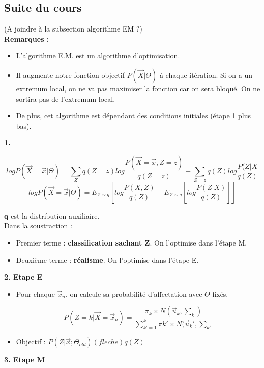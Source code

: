 \documentclass{article}
\begin{document}
\subsection{Suite du cours}

(A joindre à la subsection algorithme EM ?) \\
\textbf{Remarques :}
\begin{itemize}
\item L'algorithme E.M. est un algorithme d'optimisation.
\item Il augmente notre fonction objectif $P(\vec{X} | \Theta)$ à chaque itération. Si on a un extremum local, on ne va pas maximiser la fonction car on sera bloqué. On ne sortira pas de l'extremum local.
\item De plus, cet algorithme est dépendant des conditions initiales (étape 1 plus bas).
\end{itemize}
\textbf{1.}

\[ log P(\vec{X} = \vec{x} | \Theta) = \sum_Z q(Z = z) log \frac{P(\vec{X} = \vec{x}, Z = z)}{q(Z = z)} - \sum_{Z = z} q(Z) log \frac{P(Z | X}{q(Z)} \]
\[ log P(\vec{X} = \vec{x} | \Theta) = E_{Z \sim q} [ log \frac{P(X, Z)}{q(Z)} - E_{Z \sim q} [log \frac{P(Z | X)}{q(Z)}]  ] \]

\textbf{q} est la distribution auxiliaire. \\
Dans la soustraction : 
\begin{itemize}
\item Premier terme : \textbf{classification sachant Z}. On l'optimise dans l'étape M.
\item Deuxième terme : \textbf{réalisme}. On l'optimise dans l'étape E.
\end{itemize}

\textbf{2. Etape E}

\begin{itemize}

\item Pour chaque $\vec{x}_n$, on calcule sa probabilité d'affectation avec $\Theta$ fixés.

\[ P(Z = k | \vec{X} = \vec{x}_n) = \frac{\pi_k \times N(\vec{u}_k, \sum_k)}{\sum_{k' = 1}^{k} \pi k' \times N(\vec{u}_k', \sum_{k'}  } \]

\item Objectif : $P(Z | \vec{x}; \Theta_{old}) (fleche) q(Z)$

\end{itemize}

\textbf{3. Etape M}
\end{document}
